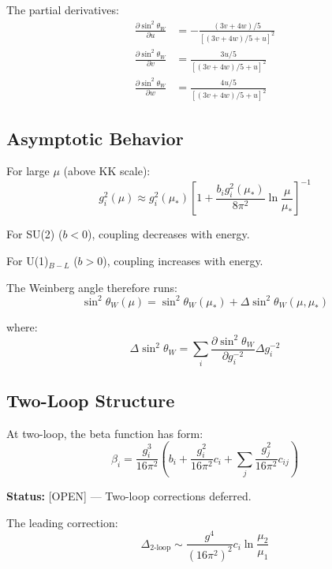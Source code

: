 \documentclass[11pt,a4paper]{article}
\begin{document}
The partial derivatives:
\begin{align}
\label{eq:partial-u}
\frac{\partial\sin^2\theta_W}{\partial u} &= -\frac{(3v+4w)/5}{[(3v+4w)/5 + u]^2} \\
\label{eq:partial-v}
\frac{\partial\sin^2\theta_W}{\partial v} &= \frac{3u/5}{[(3v+4w)/5 + u]^2} \\
\label{eq:partial-w}
\frac{\partial\sin^2\theta_W}{\partial w} &= \frac{4u/5}{[(3v+4w)/5 + u]^2}
\end{align}

\subsection{Asymptotic Behavior}
\label{subsec:asymptotic}

For large $\mu$ (above KK scale):
\begin{equation}
\label{eq:running-high}
g_i^2(\mu) \approx g_i^2(\mu_*)\left[1 + \frac{b_i g_i^2(\mu_*)}{8\pi^2}\ln\frac{\mu}{\mu_*}\right]^{-1}
\end{equation}

For SU(2) ($b < 0$), coupling decreases with energy.

For U(1)$_{B-L}$ ($b > 0$), coupling increases with energy.

The Weinberg angle therefore runs:
\begin{equation}
\label{eq:sin2-running}
\sin^2\theta_W(\mu) = \sin^2\theta_W(\mu_*) + \Delta\sin^2\theta_W(\mu, \mu_*)
\end{equation}

where:
\begin{equation}
\label{eq:delta-sin2}
\Delta\sin^2\theta_W = \sum_i \frac{\partial\sin^2\theta_W}{\partial g_i^{-2}}\Delta g_i^{-2}
\end{equation}

\subsection{Two-Loop Structure}
\label{subsec:two-loop}

At two-loop, the beta function has form:
\begin{equation}
\label{eq:beta-two-loop}
\beta_i = \frac{g_i^3}{16\pi^2}\left(b_i + \frac{g_i^2}{16\pi^2}c_i + \sum_j \frac{g_j^2}{16\pi^2}c_{ij}\right)
\end{equation}

\textbf{Status:} [OPEN] — Two-loop corrections deferred.

The leading correction:
\begin{equation}
\label{eq:two-loop-correction}
\Delta_{\text{2-loop}} \sim \frac{g^4}{(16\pi^2)^2}c_i \ln\frac{\mu_2}{\mu_1}
\end{equation}
\end{document}
